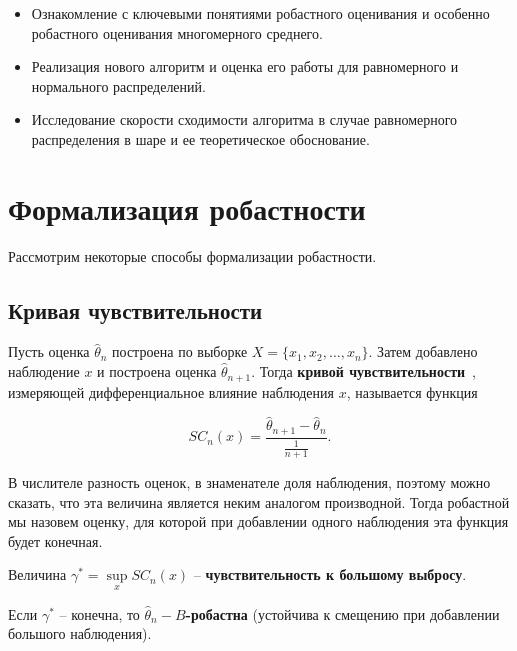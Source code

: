 \documentclass[specialist,
substylefile = spbu.rtx,
               subf,href,colorlinks=true, 12pt]{disser}
\begin{document}
\begin{itemize}
    \item Ознакомление с ключевыми понятиями робастного оценивания и особенно 
робастного оценивания многомерного среднего.

\item Реализация нового алгоритм и оценка его работы для равномерного и нормального распределений. 

\item Исследование скорости сходимости алгоритма в случае равномерного распределения в шаре и ее теоретическое обоснование. 

\end{itemize}



\chapter{Формализация робастности}
Рассмотрим некоторые способы формализации робастности. 

\section{Кривая чувствительности}
Пусть оценка  $\widehat {\theta}_n$ построена по выборке $X=\{x_1, x_2,\ldots, x_n\}$. Затем добавлено наблюдение $x$ и построена оценка $\widehat {\theta}_{n+1}$. Тогда \textbf{кривой чувствительности}~\cite{Diakonikolas}, измеряющей дифференциальное влияние наблюдения $x$, называется функция 

\begin{equation}
SC_n(x)=\frac{\widehat {\theta}_{n+1}-\widehat {\theta}_n}{\frac{1}{n+1}}.
\label{eq:SC_formula}
\end{equation}

В числителе разность оценок, в знаменателе доля наблюдения, поэтому можно сказать, что эта величина является неким аналогом производной.
Тогда робастной мы назовем оценку, для которой при добавлении одного наблюдения эта функция будет конечная. 


Величина $\gamma^*=\sup\limits_x SC_n(x)$ -- \textbf{чувствительность к большому выбросу}.

Если $\gamma^*$ -- конечна, то \textbf{$\widehat {\theta}_n-B$-робастна} \cite{Hampel} (устойчива к смещению при добавлении большого наблюдения).
\vspace{1ex}
\end{document}
